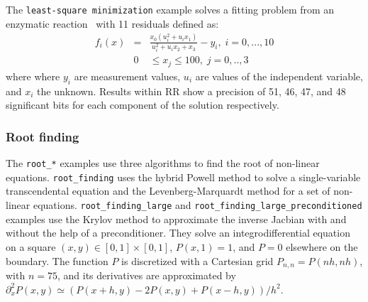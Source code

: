 The \texttt{least-square minimization} example solves a fitting problem from an enzymatic reaction~\cite{kowalik1968analysis} with 11 residuals defined as:
\begin{eqnarray*}
    f_i(x) &=& \frac{x_0(u_i^2 + u_ix_1)}{u_i^2 + u_ix_2+x_3}-y_i,\; i=0,...,10 \\
    &0& \leq x_j \leq 100,\; j=0,..,3
\end{eqnarray*}
where where $y_i$ are measurement values, $u_i$ are values of the independent
variable, and $x_i$ the unknown. Results within RR show a precision of 51, 46,
47, and 48 significant bits for each component of the solution
respectively.%

\subsubsection{Root finding}

The \texttt{root\_*} examples use three algorithms to find the root of
non-linear equations. \texttt{root\_finding} uses the hybrid Powell method to
solve a single-variable transcendental equation and the Levenberg-Marquardt
method for a set of non-linear equations. \texttt{root\_finding\_large} and
\texttt{root\_finding\_large\_preconditioned} examples use the Krylov method to
approximate the inverse Jacbian with and without the help of a preconditioner.
They solve an integrodifferential equation on a square $(x,y) \in [0,1] \times
    [0,1]$, $P(x,1)=1$, and $P=0$ elsewhere on the boundary. The function $P$ is
discretized with a Cartesian grid $P_{n,n}=P(nh,nh)$, with $n=75$, and its
derivatives are approximated by $\partial_x^2P(x,y) \simeq (P(x+h,y) - 2P(x,y) +
    P(x-h,y))/h^2$.


